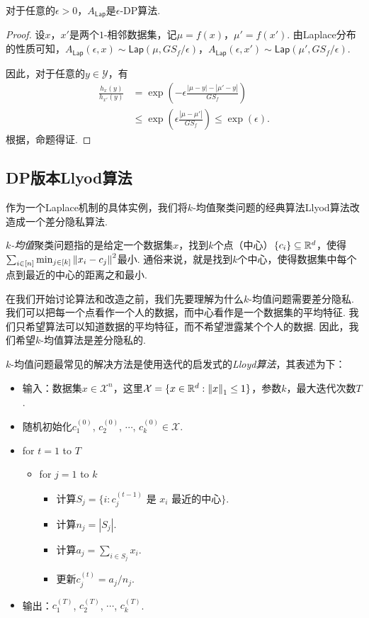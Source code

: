\begin{theorem}\label{thm:laplace-mechanism}
    对于任意的$\epsilon > 0$，$A_{\mathsf{Lap}}$是$\epsilon$-DP算法.
\end{theorem}
\begin{proof}
设$x$，$x'$是两个$1$-相邻数据集，记$\mu = f(x)$，$\mu' = f(x')$. 由Laplace分布的性质可知，$A_{\mathsf{Lap}}(\epsilon, x) \sim \mathsf{Lap}(\mu, GS_f/\epsilon)$，$A_{\mathsf{Lap}}(\epsilon, x') \sim \mathsf{Lap}(\mu', GS_f/\epsilon)$.

因此，对于任意的$y \in \mathcal Y$，有
    \[
    \begin{aligned}
        \frac{h_{x}(y)}{h_{x'}(y)} &=\exp \left(-\epsilon \frac{|\mu - y| - |\mu' - y|}{GS_f} \right) \\
        &\leq \exp \left(\epsilon \frac{|\mu - \mu'|}{GS_f} \right)\leq \exp(\epsilon).
    \end{aligned}
    \]
根据，命题得证. 
\end{proof}

\subsection{DP版本Llyod算法}
作为一个Laplace机制的具体实例，我们将$k$-均值聚类问题的经典算法Llyod算法改造成一个差分隐私算法.

\textit{$k$-均值}聚类问题指的是给定一个数据集$x$，找到$k$个点（中心）$\{c_i\} \subseteq \mathbb{R}^d$，使得$\sum_{i \in [n]} \min_{j\in[k]} \left\|x_i - c_j\right\|^2$最小. 通俗来说，就是找到$k$个中心，使得数据集中每个点到最近的中心的距离之和最小. 

在我们开始讨论算法和改造之前，我们先要理解为什么$k$-均值问题需要差分隐私. 我们可以把每一个点看作一个人的数据，而中心看作是一个数据集的平均特征. 我们只希望算法可以知道数据的平均特征，而不希望泄露某个个人的数据. 因此，我们希望$k$-均值算法是差分隐私的.

$k$-均值问题最常见的解决方法是使用迭代的启发式的\textit{Lloyd算法}，其表述为下：
\begin{itemize}
    \item 输入：数据集$x \in \mathcal X^n$，这里$\mathcal X = \{x \in \mathbb{R}^d : \left\|x\right\|_1 \leq 1 \}$，参数$k$，最大迭代次数$T$.
    \item 随机初始化$c_1^{(0)}$, $c_2^{(0)}$, $\cdots$, $c_k^{(0)} \in \mathcal X$.
    \item for $t=1$ to $T$
    \begin{itemize}
        \item for $j=1$ to $k$
        \begin{itemize}
            \item 计算$S_j = \{i : c_{j}^{(t-1)} \text{ 是\ } x_i \text{ 最近的中心}\}$.
            \item 计算$n_j = |S_j|$.
            \item 计算$a_j = \sum_{i\in S_j} x_i$.
            \item 更新$c_j^{(t)} = a_j/n_j$.
        \end{itemize}
    \end{itemize}
    \item 输出：$c_1^{(T)}$, $c_2^{(T)}$, $\cdots$, $c_k^{(T)}$.
\end{itemize}

